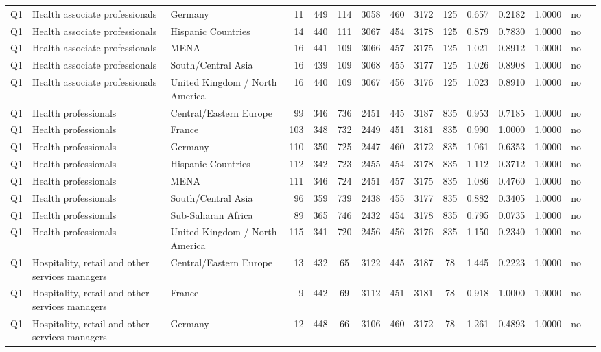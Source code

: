 \begin{longtable}{lllrcccccccccll}
Q1 & Health associate professionals & Germany & 11 & 449 & 114 & 3058 & 460 & 3172 & 125 & 0.657 & 0.2182 & 1.0000 & no \\
Q1 & Health associate professionals & Hispanic Countries & 14 & 440 & 111 & 3067 & 454 & 3178 & 125 & 0.879 & 0.7830 & 1.0000 & no \\
Q1 & Health associate professionals & MENA & 16 & 441 & 109 & 3066 & 457 & 3175 & 125 & 1.021 & 0.8912 & 1.0000 & no \\
Q1 & Health associate professionals & South/Central Asia & 16 & 439 & 109 & 3068 & 455 & 3177 & 125 & 1.026 & 0.8908 & 1.0000 & no \\
Q1 & Health associate professionals & United Kingdom / North America & 16 & 440 & 109 & 3067 & 456 & 3176 & 125 & 1.023 & 0.8910 & 1.0000 & no \\
Q1 & Health professionals & Central/Eastern Europe & 99 & 346 & 736 & 2451 & 445 & 3187 & 835 & 0.953 & 0.7185 & 1.0000 & no \\
Q1 & Health professionals & France & 103 & 348 & 732 & 2449 & 451 & 3181 & 835 & 0.990 & 1.0000 & 1.0000 & no \\
Q1 & Health professionals & Germany & 110 & 350 & 725 & 2447 & 460 & 3172 & 835 & 1.061 & 0.6353 & 1.0000 & no \\
Q1 & Health professionals & Hispanic Countries & 112 & 342 & 723 & 2455 & 454 & 3178 & 835 & 1.112 & 0.3712 & 1.0000 & no \\
Q1 & Health professionals & MENA & 111 & 346 & 724 & 2451 & 457 & 3175 & 835 & 1.086 & 0.4760 & 1.0000 & no \\
Q1 & Health professionals & South/Central Asia & 96 & 359 & 739 & 2438 & 455 & 3177 & 835 & 0.882 & 0.3405 & 1.0000 & no \\
Q1 & Health professionals & Sub-Saharan Africa & 89 & 365 & 746 & 2432 & 454 & 3178 & 835 & 0.795 & 0.0735 & 1.0000 & no \\
Q1 & Health professionals & United Kingdom / North America & 115 & 341 & 720 & 2456 & 456 & 3176 & 835 & 1.150 & 0.2340 & 1.0000 & no \\
Q1 & Hospitality, retail and other services managers & Central/Eastern Europe & 13 & 432 & 65 & 3122 & 445 & 3187 & 78 & 1.445 & 0.2223 & 1.0000 & no \\
Q1 & Hospitality, retail and other services managers & France & 9 & 442 & 69 & 3112 & 451 & 3181 & 78 & 0.918 & 1.0000 & 1.0000 & no \\
Q1 & Hospitality, retail and other services managers & Germany & 12 & 448 & 66 & 3106 & 460 & 3172 & 78 & 1.261 & 0.4893 & 1.0000 & no \\

\end{longtable}
